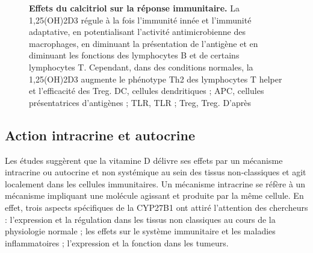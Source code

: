 \documentclass[
  a4paper,
  DIV=11,
  numbers=noendperiod,
  listof=totoc]{scrreprt}
\begin{document}
\begin{figure}


\caption[Effets du calcitriol sur la réponse
immunitaire.]{\label{fig-vd-immune-effect}\textbf{Effets du calcitriol
sur la réponse immunitaire.} La \ac{1,25(OH)2D3} régule à la fois
l'immunité innée et l'immunité adaptative, en potentialisant l'activité
antimicrobienne des macrophages, en diminuant la présentation de
l'antigène et en diminuant les fonctions des lymphocytes B et de
certains lymphocytes T. Cependant, dans des conditions normales, la
\ac{1,25(OH)2D3} augmente le phénotype \ac{Th2} des lymphocytes T helper
et l'efficacité des \ac{Treg}. DC, cellules dendritiques ; APC, cellules
présentatrices d'antigènes ; \acs{TLR}, \acl{TLR} ; \ac{Treg},
\acl{Treg}. D'après \textcite{Cutolo.2014}}

\end{figure}%

\subsection{Action intracrine et
autocrine}\label{action-intracrine-et-autocrine}

Les études suggèrent que la vitamine D délivre ses effets par un
mécanisme intracrine ou autocrine et non systémique au sein des tissus
non-classiques \autocite{Hewison.2007} et agit localement dans les
cellules immunitaires. Un mécanisme intracrine se réfère à un mécanisme
impliquant une molécule agissant et produite par la même cellule. En
effet, trois aspects spécifiques de la \ac{CYP27B1} ont attiré
l'attention des chercheurs : l'expression et la régulation dans les
tissus non classiques au cours de la physiologie normale ; les effets
sur le système immunitaire et les maladies inflammatoires ; l'expression
et la fonction dans les tumeurs.
\end{document}
